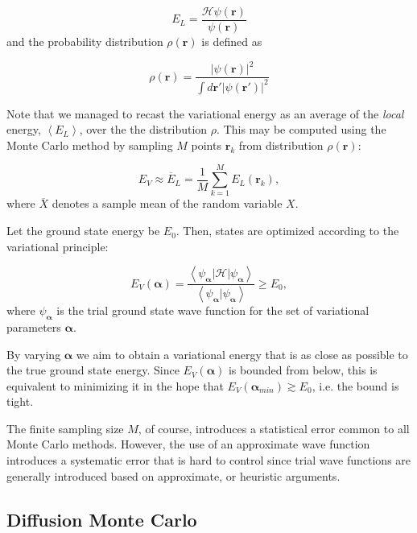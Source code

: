 \begin{equation}\label{eq:local_energy}
E_L = \frac{\mathcal{H} \psi (\bm r) }{\psi (\bm r)}
\end{equation}
and the probability distribution $\rho (\bm r)$ is defined as

\begin{equation}\label{eq:rho}
\rho (\bm r) = \frac{ | \psi (\bm r) |^2}{ \int d\bm r' | \psi (\bm r') |^2}
\end{equation}

Note that we managed to recast the variational energy as an average of the \emph{local} energy, $\left\langle E_L \right\rangle $, over the the distribution $\rho$.
This may be computed using the Monte Carlo method by sampling $M$ points $\bm r_k$ from distribution $\rho (\bm r)$:

\begin{equation}\label{eq:average}
E_V \approx \overline{E}_L = \frac{1}{M} \sum_{k= 1}^{M} E_L (\bm r_k) ,
\end{equation}
where $\overline {X}$ denotes a sample mean of the random variable $X$.

Let the ground state energy be $E_0$.
Then, states are optimized according to the variational principle:

\begin{equation}
E_V(\bm \alpha) = \frac{\left\langle \psi_{\bm \alpha} | \mathcal{H} | \psi_{\bm \alpha} \right\rangle}{\left\langle\psi_{\bm \alpha} | \psi_{\bm \alpha} \right\rangle} \ge E_0,
\end{equation}
where $\psi_{\bm \alpha}$ is the trial ground state wave function for the set of variational parameters ${\bm \alpha}$.

By varying $\bm \alpha$ we aim to obtain a variational energy that is as close as possible to the true ground state energy.
Since $E_V(\bm \alpha)$ is bounded from below, this is equivalent to minimizing it in the hope that $E_V(\bm \alpha_{min}) \gtrsim E_0$, i.e. the bound is tight.

The finite sampling size $M$, of course, introduces a statistical error common to all Monte Carlo methods. 
However, the use of an approximate wave function introduces a systematic error that is hard to control since trial wave functions are generally introduced based on approximate, or heuristic arguments.

\subsection{Diffusion Monte Carlo}\label{subsec:dmc}

